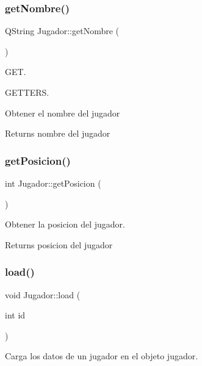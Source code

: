 \subsubsection{\texorpdfstring{get\+Nombre()}{getNombre()}}
{\footnotesize\ttfamily Q\+String Jugador\+::get\+Nombre (\begin{DoxyParamCaption}{ }\end{DoxyParamCaption})}



G\+ET. 

G\+E\+T\+T\+E\+RS.

Obtener el nombre del jugador \begin{DoxyReturn}{Returns}
nombre del jugador 
\end{DoxyReturn}
\mbox{\label{classJugador_afd85bc493fbd7626cdee30d9a2e18fd2}} 
\subsubsection{\texorpdfstring{get\+Posicion()}{getPosicion()}}
{\footnotesize\ttfamily int Jugador\+::get\+Posicion (\begin{DoxyParamCaption}{ }\end{DoxyParamCaption})}



Obtener la posicion del jugador. 

\begin{DoxyReturn}{Returns}
posicion del jugador 
\end{DoxyReturn}
\mbox{\label{classJugador_a500d0e508636a711ae941b7557641c1a}} 
\subsubsection{\texorpdfstring{load()}{load()}\hspace{0.1cm}{\footnotesize\ttfamily [1/2]}}
{\footnotesize\ttfamily void Jugador\+::load (\begin{DoxyParamCaption}\item[{int}]{id }\end{DoxyParamCaption})}



Carga los datos de un jugador en el objeto jugador. 


